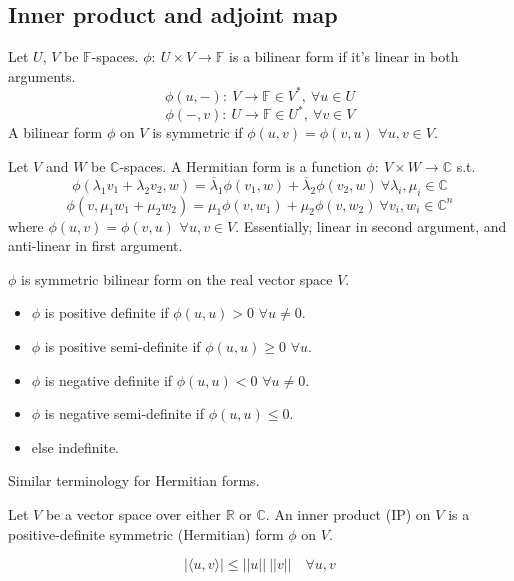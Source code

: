 \documentclass[a4paper]{article}
\begin{document}
\subsection{Inner product and adjoint map}
\begin{defi}
Let $U$, $V$ be $\mathbb{F}$-spaces. $\phi:~U\times V\rightarrow\mathbb{F}$ is a bilinear form if it's linear in both arguments.
$$\phi(u,-):~V\rightarrow\mathbb{F}\in V^*,~\forall u\in U$$
$$\phi(-,v):~U\rightarrow\mathbb{F}\in U^*,~\forall v\in V$$
A bilinear form $\phi$ on $V$ is symmetric if $\phi(u,v)=\phi(v,u)$ $\forall u,v\in V$.
\end{defi}
\begin{defi}
Let $V$ and $W$ be $\mathbb{C}$-spaces. A Hermitian form is a function $\phi:~V\times W\rightarrow\mathbb{C}$ s.t.
$$\phi(\lambda_1v_1+\lambda_2v_2,w)=\overline{\lambda}_1\phi(v_1,w)+\overline{\lambda}_2\phi(v_2,w)~\forall\lambda_i,\mu_i\in\mathbb{C}$$
$$\phi(v,\mu_1w_1+\mu_2w_2)=\mu_1\phi(v,w_1)+\mu_2\phi(v,w_2)~\forall v_i,w_i\in\mathbb{C}^n$$
where $\phi(u,v)=\phi(v,u)$ $\forall u,v\in V$. Essentially, linear in second argument, and anti-linear in first argument.
\end{defi}
\begin{defi}[Definiteness]
$\phi$ is symmetric bilinear form on the real vector space $V$.
\begin{itemize}
    \item $\phi$ is positive definite if $\phi(u,u)>0$ $\forall u\neq 0$.
    \item $\phi$ is positive semi-definite if $\phi(u,u)\geq0$ $\forall u$.
    \item $\phi$ is negative definite if $\phi(u,u)<0$ $\forall u\neq 0$.
    \item $\phi$ is negative semi-definite if $\phi(u,u)\leq 0$.
    \item else indefinite.
\end{itemize}
Similar terminology for Hermitian forms.
\end{defi}
\begin{defi}
Let $V$ be a vector space over either $\mathbb{R}$ or $\mathbb{C}$. An inner product (IP) on $V$ is a positive-definite symmetric (Hermitian) form $\phi$ on $V$.
\end{defi}
\begin{lemma}
\begin{equation}
|\langle u,v\rangle|\leq||u||~||v||\quad\forall u,v\tag{5.3}
\end{equation}
\end{lemma}
\end{document}
